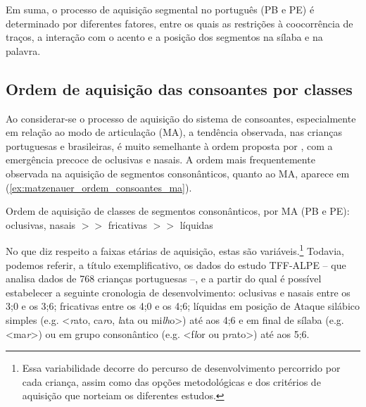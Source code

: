 \documentclass[output=paper]{LSP/langsci}
\begin{document}
Em suma, o processo de aquisição segmental no português (PB e PE) é determinado por diferentes fatores, entre os quais as restrições à coocorrência de traços, a interação com o acento e a posição dos segmentos na sílaba e na palavra.


\subsection{Ordem de aquisição das consoantes por classes}
\label{subsec:matzenauer_ordem_classes}

Ao considerar-se o processo de aquisição do sistema de consoantes, especialmente em relação ao modo de articulação (MA), a tendência observada, nas crianças portuguesas e brasileiras, é muito semelhante à ordem proposta por \citet{jakobson1941}, com a emergência precoce de oclusivas e nasais. A ordem mais frequentemente observada na aquisição de segmentos consonânticos, quanto ao MA, aparece em (\ref{ex:matzenauer_ordem_consoantes_ma}).

\begin{exe}
\ex\label{ex:matzenauer_ordem_consoantes_ma} Ordem de aquisição de classes de segmentos consonânticos, por MA (PB e PE):\\oclusivas, nasais $>>$ fricativas $>>$ líquidas
\end{exe}

No que diz respeito a faixas etárias de aquisição, estas são variáveis.\footnote{Essa variabilidade decorre do percurso de desenvolvimento percorrido por cada criança, assim como das opções metodológicas e dos critérios de aquisição que norteiam os diferentes estudos.} Todavia, podemos referir, a título exemplificativo, os dados do estudo TFF-ALPE \citep{mendes_etal2009,mendes_etal2013} -- que analisa dados de 768 crianças portuguesas --, e a partir do qual é possível estabelecer a seguinte cronologia de desenvolvimento:  oclusivas e nasais entre os 3;0 e os 3;6; fricativas entre os 4;0 e os 4;6; líquidas em posição de Ataque silábico simples (e.g. <\textit{r}ato, ca\textit{r}o, \textit{l}ata ou mi\textit{lh}o>) até aos 4;6 e em final de sílaba (e.g. <ma\textit{r}>)  ou em grupo consonântico (e.g. <f\textit{l}or ou p\textit{r}ato>) até aos 5;6.
\end{document}
